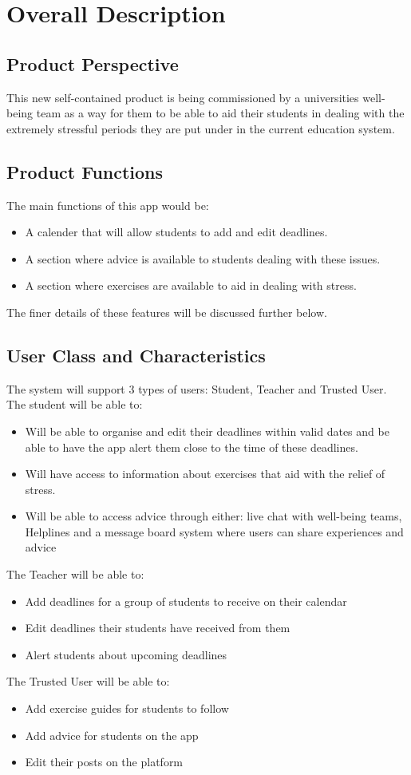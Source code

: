 \documentclass[a4paper]{article}
\begin{document}
\section {Overall Description}
\subsection {Product Perspective}
This new self-contained product is being commissioned by a universities well-being team as a way for them to be able to aid their students in dealing with the extremely stressful periods they are put under in the current education system. 

\subsection {Product Functions}
The main functions of this app would be:
\begin{itemize}
	\item A calender that will allow students to add and edit deadlines.
	\item A section where advice is available to students dealing with these issues.
	\item A section where exercises are available to aid in dealing with stress.
\end{itemize}
The finer details of these features will be discussed further below.
\pagebreak

\subsection{User Class and Characteristics}
The system will support 3 types of users: Student, Teacher and Trusted User. The student will be able to:
\begin{itemize}
	\item Will be able to organise and edit their deadlines within valid dates and be able to have the app alert them close to the time of these deadlines. 
	\item Will have access to information about exercises that aid with the relief of stress. 
	\item Will be able to access advice through either: live chat with well-being teams, Helplines and a message board system where users can share experiences and advice
\end{itemize}
The Teacher will be able to:
\begin{itemize}
	\item Add deadlines for a group of students to receive on their calendar
	\item Edit deadlines their students have received from them
	\item Alert students about upcoming deadlines
\end{itemize}
The Trusted User will be able to:
\begin{itemize}
	\item Add exercise guides for students to follow
	\item Add advice for students on the app
	\item Edit their posts on the platform
\end{itemize}
 
\end{document}
